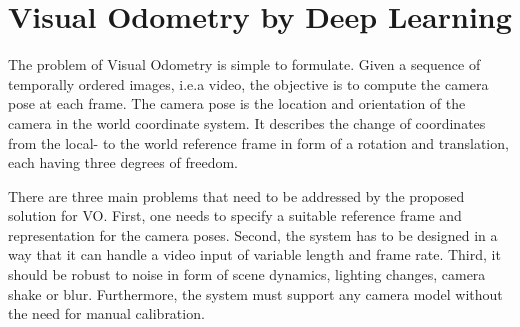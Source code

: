 		
		
		
		
		
		
		
	\section{Visual Odometry by Deep Learning}
		
		The problem of Visual Odometry is simple to formulate.
		Given a sequence of temporally ordered images, i.e.\@ a video, the objective is to compute the camera pose at each frame.
		The camera pose is the location and orientation of the camera in the world coordinate system.
		It describes the change of coordinates from the local- to the world reference frame in form of a rotation and translation, each having three degrees of freedom.

		There are three main problems that need to be addressed by the proposed solution for VO.
		First, one needs to specify a suitable reference frame and representation for the camera poses.
		Second, the system has to be designed in a way that it can handle a video input of variable length and frame rate.
		Third, it should be robust to noise in form of scene dynamics, lighting changes, camera shake or blur.
		Furthermore, the system must support any camera model without the need for manual calibration.
		
